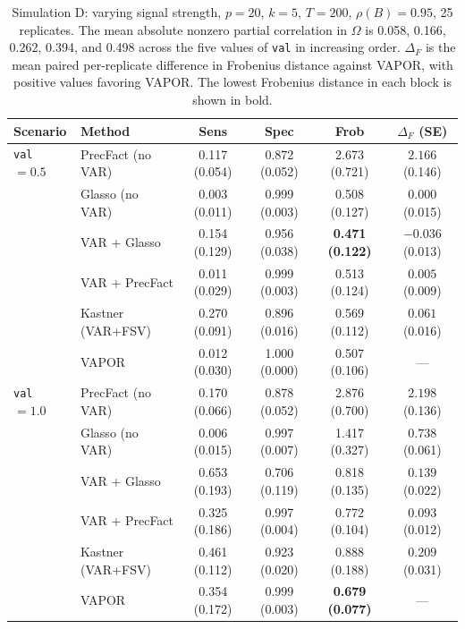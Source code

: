 \begin{table}[h!]
\centering
\small
\setlength{\tabcolsep}{3.5pt}
\caption{Simulation D: varying signal strength, $p=20$, $k=5$, $T=200$, $\rho(B)=0.95$, 25 replicates. The mean absolute nonzero partial correlation in $\Omega$ is 0.058, 0.166, 0.262, 0.394, and 0.498 across the five values of \texttt{val} in increasing order. $\Delta_F$ is the mean paired per-replicate difference in Frobenius distance against VAPOR, with positive values favoring VAPOR. The lowest Frobenius distance in each block is shown in bold.}
\label{tab:sim-d}
\begin{tabular}{llcccc}
\toprule
Scenario & Method & Sens & Spec & Frob & $\Delta_F$ (SE) \\
\midrule
\texttt{val} $= 0.5$ & PrecFact (no VAR)  & 0.117 (0.054) & 0.872 (0.052) & 2.673 (0.721) & $2.166$ (0.146) \\
                     & Glasso (no VAR)    & 0.003 (0.011) & 0.999 (0.003) & 0.508 (0.127) & $0.000$ (0.015) \\
                     & VAR + Glasso       & 0.154 (0.129) & 0.956 (0.038) & \textbf{0.471 (0.122)} & $-0.036$ (0.013) \\
                     & VAR + PrecFact     & 0.011 (0.029) & 0.999 (0.003) & 0.513 (0.124) & $0.005$ (0.009) \\
                     & Kastner (VAR+FSV)  & 0.270 (0.091) & 0.896 (0.016) & 0.569 (0.112) & $0.061$ (0.016) \\
                     & VAPOR              & 0.012 (0.030) & 1.000 (0.000) & 0.507 (0.106) & --- \\
\midrule
\texttt{val} $= 1.0$ & PrecFact (no VAR)  & 0.170 (0.066) & 0.878 (0.052) & 2.876 (0.700) & $2.198$ (0.136) \\
                     & Glasso (no VAR)    & 0.006 (0.015) & 0.997 (0.007) & 1.417 (0.327) & $0.738$ (0.061) \\
                     & VAR + Glasso       & 0.653 (0.193) & 0.706 (0.119) & 0.818 (0.135) & $0.139$ (0.022) \\
                     & VAR + PrecFact     & 0.325 (0.186) & 0.997 (0.004) & 0.772 (0.104) & $0.093$ (0.012) \\
                     & Kastner (VAR+FSV)  & 0.461 (0.112) & 0.923 (0.020) & 0.888 (0.188) & $0.209$ (0.031) \\
                     & VAPOR              & 0.354 (0.172) & 0.999 (0.003) & \textbf{0.679 (0.077)} & --- \\
\midrule

\end{tabular}
\end{table}
